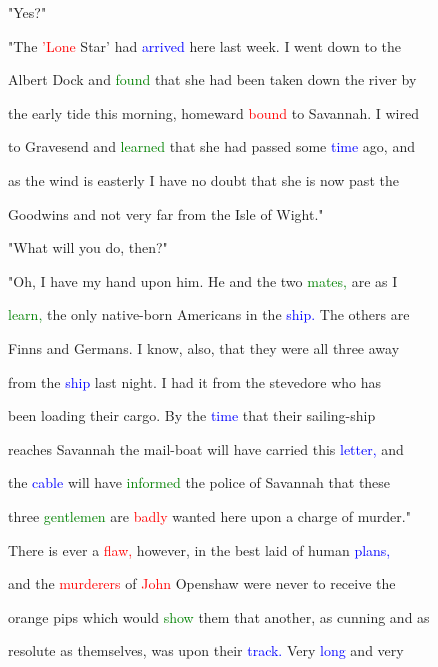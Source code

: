  "Yes?"



 "The \textcolor{red}{'Lone} \textcolor{BurntOrange}{Star'} had \textcolor{blue}{arrived} here last week. I went down to the

 Albert Dock and \textcolor{green}{found} that she had been taken down the river by

 the early tide this morning, homeward \textcolor{red}{bound} to Savannah. I wired

 to Gravesend and \textcolor{green}{learned} that she had passed some \textcolor{blue}{time} ago, and

 as the wind is easterly I have no \textcolor{BurntOrange}{doubt} that she is now past the

 Goodwins and not very far from the Isle of Wight."



 "What will you do, then?"



 "Oh, I have my hand upon him. He and the two \textcolor{green}{mates,} are as I

 \textcolor{green}{learn,} the only native-born Americans in the \textcolor{blue}{ship.} The others are

 Finns and Germans. I know, also, that they were all three away

 from the \textcolor{blue}{ship} last night. I had it from the stevedore who has

 been loading their cargo. By the \textcolor{blue}{time} that their sailing-ship

 reaches Savannah the mail-boat will have carried this \textcolor{blue}{letter,} and

 the \textcolor{blue}{cable} will have \textcolor{green}{informed} the \textcolor{BurntOrange}{police} of Savannah that these

 three \textcolor{green}{gentlemen} are \textcolor{red}{badly} wanted here upon a charge of \textcolor{BurntOrange}{murder."}



 There is ever a \textcolor{red}{flaw,} however, in the best laid of human \textcolor{blue}{plans,}

 and the \textcolor{red}{murderers} of \textcolor{red}{John} Openshaw were never to receive the

 orange pips which would \textcolor{green}{show} them that another, as \textcolor{BurntOrange}{cunning} and as

 resolute as themselves, was upon their \textcolor{blue}{track.} Very \textcolor{blue}{long} and very

